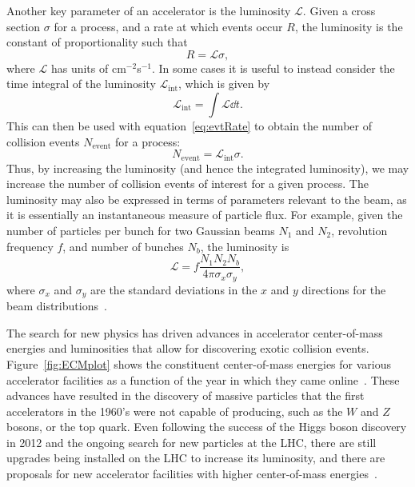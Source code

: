 Another key parameter of an accelerator is the luminosity $\mathcal{L}$.
Given a cross section $\sigma$ for a process, and a rate at which events occur $R$, the luminosity is the constant of proportionality such that
\begin{equation}\label{eq:evtRate}
  R=\mathcal{L}\sigma,
\end{equation}
where $\mathcal{L}$ has units of cm$^{-2}$s$^{-1}$. %
In some cases it is useful to instead consider the time integral of the luminosity $\mathcal{L}_\mathrm{int}$, which is given by
\begin{equation}
  \mathcal{L}_\mathrm{int}=\int\mathcal{L}\dd{t}.
\end{equation}
This can then be used with equation~\ref{eq:evtRate} to obtain the number of collision events $N_\mathrm{event}$ for a process:
\begin{equation}
  N_\mathrm{event}=\mathcal{L}_\mathrm{int}\sigma.
\end{equation}
Thus, by increasing the luminosity (and hence the integrated luminosity), we may increase the number of collision events of interest for a given process.
The luminosity may also be expressed in terms of parameters relevant to the beam, as it is essentially an instantaneous measure of particle flux. %
For example, given the number of particles per bunch for two Gaussian beams $N_1$ and $N_2$, revolution frequency $f$, and number of bunches $N_b$, the luminosity is
\begin{equation}
  \mathcal{L}=f\frac{N_1N_2N_b}{4\pi\sigma_x\sigma_y},
\end{equation}
where $\sigma_x$ and $\sigma_y$ are the standard deviations in the $x$ and $y$ directions for the beam distributions~\cite{Herr:941318}.

The search for new physics has driven advances in accelerator center-of-mass energies and luminosities that allow for discovering exotic collision events.
Figure~\ref{fig:ECMplot} shows the constituent center-of-mass energies for various accelerator facilities as a function of the year in which they came online~\cite{Panofsky}.
These advances have resulted in the discovery of massive particles that the first accelerators in the 1960's were not capable of producing, such as the $W$ and $Z$ bosons, or the top quark. %
Even following the success of the Higgs boson discovery in 2012 and the ongoing search for new particles at the LHC, there are still upgrades being installed on the LHC to increase its luminosity, and there are proposals for new accelerator facilities with higher center-of-mass energies~\cite{Bicer_2014}.

